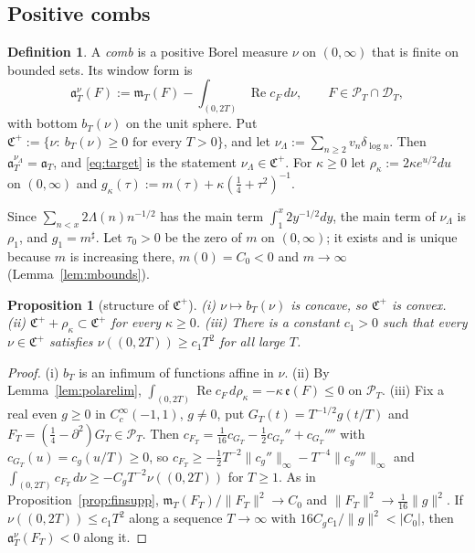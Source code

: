 \documentclass[11pt]{amsart}
\newtheorem{proposition}[theorem]{Proposition}
\theoremstyle{definition}
\newtheorem{definition}[theorem]{Definition}
\theoremstyle{remark}
\newcommand{\Rel}{\operatorname{Re}}
\newcommand{\PT}{\mathcal P_T}
\newcommand{\cF}{c_F}
\newcommand{\mT}{\mathfrak m_T}
\begin{document}
\subsection{Positive combs}\label{subsec:poscombs}

\begin{definition}\label{def:comb}
A \emph{comb} is a positive Borel measure $\nu$ on $(0,\infty)$ that is finite on bounded sets. Its window form is
\[
\mathfrak a^\nu_T(F):=\mT(F)-\int_{(0,2T)}\Rel\cF\,d\nu,\qquad F\in\PT\cap\mathcal D_T,
\]
with bottom $b_T(\nu)$ on the unit sphere. Put $\mathfrak C^+:=\{\nu:\ b_T(\nu)\ge0\text{ for every }T>0\}$, and let
$\nu_\Lambda:=\sum_{n\ge2}v_n\delta_{\log n}$. Then $\mathfrak a^{\nu_\Lambda}_T=\mathfrak a_T$, and \eqref{eq:target} is the
statement $\nu_\Lambda\in\mathfrak C^+$. For $\kappa\ge0$ let $\rho_\kappa:=2\kappa e^{u/2}du$ on $(0,\infty)$ and
$g_\kappa(\tau):=m(\tau)+\kappa(\frac14+\tau^2)^{-1}$.
\end{definition}

Since $\sum_{n<x}2\Lambda(n)n^{-1/2}$ has the main term $\int_1^x2y^{-1/2}dy$, the main term of $\nu_\Lambda$ is $\rho_1$, and
$g_1=m^\sharp$. Let $\tau_0>0$ be the zero of $m$ on $(0,\infty)$; it exists and is unique because $m$ is increasing there,
$m(0)=C_0<0$ and $m\to\infty$ (Lemma~\ref{lem:mbounds}).

\begin{proposition}[structure of $\mathfrak C^+$]\label{prop:Cplus}
\emph{(i)} $\nu\mapsto b_T(\nu)$ is concave, so $\mathfrak C^+$ is convex.
\emph{(ii)} $\mathfrak C^++\rho_\kappa\subset\mathfrak C^+$ for every $\kappa\ge0$.
\emph{(iii)} There is a constant $c_1>0$ such that every $\nu\in\mathfrak C^+$ satisfies $\nu((0,2T))\ge c_1T^2$ for all large $T$.
\end{proposition}

\begin{proof}
(i) $b_T$ is an infimum of functions affine in $\nu$. (ii) By Lemma~\ref{lem:polarelim},
$\int_{(0,2T)}\Rel\cF\,d\rho_\kappa=-\kappa\,\mathfrak e(F)\le0$ on $\PT$. (iii) Fix a real even $g\ge0$ in $C_c^\infty(-1,1)$, $g\ne0$,
put $G_T(t)=T^{-1/2}g(t/T)$ and $F_T=(\frac14-\partial^2)G_T\in\PT$. Then
$c_{F_T}=\frac1{16}c_{G_T}-\frac12c_{G_T}''+c_{G_T}''''$ with $c_{G_T}(u)=c_g(u/T)\ge0$, so
$c_{F_T}\ge-\frac12T^{-2}\|c_g''\|_\infty-T^{-4}\|c_g''''\|_\infty$ and
$\int_{(0,2T)}c_{F_T}\,d\nu\ge-C_gT^{-2}\nu((0,2T))$ for $T\ge1$. As in Proposition~\ref{prop:finsupp},
$\mT(F_T)/\|F_T\|^2\to C_0$ and $\|F_T\|^2\to\frac1{16}\|g\|^2$. If $\nu((0,2T))\le c_1T^2$ along a sequence $T\to\infty$ with
$16C_gc_1/\|g\|^2<|C_0|$, then $\mathfrak a^\nu_T(F_T)<0$ along it.
\end{proof}
\end{document}
